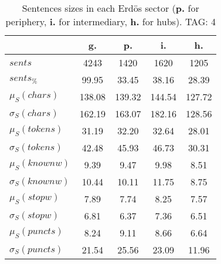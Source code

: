 \begin{table}[h!]
\begin{center}
\begin{tabular}{| l | c | c | c | c |}\hline
 & g. & p. & i. & h. \\\hline
$sents$ & 4243  & 1420  & 1620  & 1205 \\\hline
$sents_{\%}$ & 99.95  & 33.45  & 38.16  & 28.39 \\\hline
$\mu_S(chars)$ & 138.08  & 139.32  & 144.54  & 127.72 \\\hline
$\sigma_S(chars)$ & 162.19  & 163.07  & 182.16  & 128.56 \\\hline
$\mu_S(tokens)$ & 31.19  & 32.20  & 32.64  & 28.01 \\\hline
$\sigma_S(tokens)$ & 42.48  & 45.93  & 46.73  & 30.31 \\\hline
$\mu_S(knownw)$ & 9.39  & 9.47  & 9.98  & 8.51 \\\hline
$\sigma_S(knownw)$ & 10.44  & 10.11  & 11.75  & 8.75 \\\hline
$\mu_S(stopw)$ & 7.89  & 7.74  & 8.25  & 7.57 \\\hline
$\sigma_S(stopw)$ & 6.81  & 6.37  & 7.36  & 6.51 \\\hline
$\mu_S(puncts)$ & 8.24  & 9.11  & 8.66  & 6.64 \\\hline
$\sigma_S(puncts)$ & 21.54  & 25.56  & 23.09  & 11.96 \\\hline
\end{tabular}
\caption{Sentences sizes in each Erd\"os sector ({{\bf p.}} for periphery, {{\bf i.}} for intermediary, {{\bf h.}} for hubs). TAG: 4}
\end{center}
\end{table}
